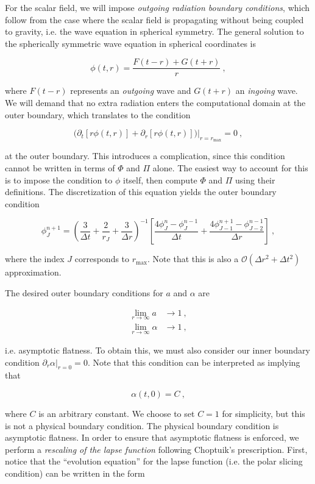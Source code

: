 \documentclass[a4paper,11pt]{article}
\renewcommand{\a}{\alpha}
\newcommand{\pd}{\partial}
\newcommand{\dt}{\Delta t}
\newcommand{\dr}{\Delta r}
\newcommand{\order}[2]{\mathcal{O}\lrpar{#1^{#2}}}
\newcommand{\lrpar}[1]{\left( #1 \right)}
\newcommand{\lrsquare}[1]{\left[ #1 \right]}
\newcommand{\blrpar}[1]{\big( #1 \big)}
\newcommand{\n}{\noindent}
\newcommand{\eq}[1]{
  \begin{equation}
    #1
  \end{equation}
}
\newcommand{\al}[1]{
  \begin{align}
    #1
  \end{align}
}
\begin{document}
For the scalar field, we will impose \emph{outgoing radiation boundary conditions}, which follow from the case where the scalar field is propagating without being coupled to gravity, i.e. the wave equation in spherical symmetry. The general solution to the spherically symmetric wave equation in spherical coordinates is

\eq{ \phi(t,r) = \frac{F(t-r) + G(t+r)}{r}\ , }

\n where $F(t-r)$ represents an \emph{outgoing} wave and $G(t+r)$ an \emph{ingoing} wave. We will demand that no extra radiation enters the computational domain at the outer boundary, which translates to the condition

\eq{ \left.\blrpar{\pd_{t}\lrsquare{r\phi(t,r)} + \pd_{r}\lrsquare{r\phi(t,r)}}\right|_{r=r_{\max}} = 0\ , }

\n at the outer boundary. This introduces a complication, since this condition cannot be written in terms of $\Phi$ and $\Pi$ alone. The easiest way to account for this is to impose the condition to $\phi$ itself, then compute $\Phi$ and $\Pi$ using their definitions. The discretization of this equation yields the outer boundary condition

\eq{ \phi^{n+1}_{J} = \lrpar{\frac{3}{\dt} + \frac{2}{r_{J}} + \frac{3}{\dr}}^{-1}\lrsquare{\frac{4\phi^{n}_{J} - \phi^{n-1}_{J}}{\dt} + \frac{4\phi^{n+1}_{J-1} - \phi^{n-1}_{J-2}}{\dr}}\ ,}

\n where the index $J$ corresponds to $r_{\max}$. Note that this is also a $\order{\dr^{2}+\dt}{2}$ approximation.

The desired outer boundary conditions for $a$ and $\a$ are

\al{
  \lim_{r\to \infty}a  &\to 1\ ,\\
  \lim_{r\to \infty}\a &\to 1\ ,
}

\n i.e. asymptotic flatness. To obtain this, we must also consider our inner boundary condition $\left.\pd_{r}\a\right|_{r=0}=0$. Note that this condition can be interpreted as implying that

\eq{ \alpha(t,0) = C\ , }

\n where $C$ is an arbitrary constant. We choose to set $C=1$ for simplicity, but this is not a physical boundary condition. The physical boundary condition is asymptotic flatness. In order to ensure that asymptotic flatness is enforced, we perform a \emph{rescaling of the lapse function} following Choptuik's prescription. First, notice that the ``evolution equation'' for the lapse function (i.e. the polar slicing condition) can be written in the form
\end{document}
